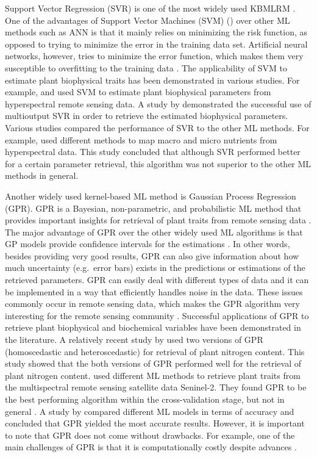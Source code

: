 \documentclass[a4paper, twoside]{templates/ociamthesis}
\begin{document}
Support Vector Regression (SVR) \citep{drucker1997support} is one of the most widely used KBMLRM \citep{verrelst2019quantifying}. One of the advantages of Support Vector Machines (SVM) (\citet{boser1992training}) over other ML methods such as ANN is that it mainly relies on minimizing the risk function, as opposed to trying to minimize the error in the training data set. Artificial neural networks, however, tries to minimize the error function, which makes them very susceptible to overfitting to the training data \citep{karimi2008application}. The applicability of SVM to estimate plant biophysical traits has been demonstrated in various studies. For example, \citet{karimi2008application} and \citet{yang2011estimating} used SVM to estimate plant biophysical parameters from hyperspectral remote sensing data. A study by \citet{tuia2011multioutput} demonstrated the successful use of multioutput SVR in order to retrieve the estimated biophysical parameters. Various studies compared the performance of SVR to the other ML methods. For example, \citet{pullanagari2016mapping} used different methods to map macro and micro nutrients from hyperspectral data. This study concluded that although SVR performed better for a certain parameter retrieval, this algorithm was not superior to the other ML methods in general.

Another widely used kernel-based ML method is Gaussian Process Regression (GPR). GPR is a Bayesian, non-parametric, and probabilistic ML method that provides important insights for retrieval of plant traits from remote sensing data \citep{camps2016survey, camps2019perspective}. The major advantage of GPR over the other widely used ML algorithms is that GP models provide confidence intervals for the estimations \citep{berger2020retrieval}. In other words, besides providing very good results, GPR can also give information about how much uncertainty (e.g.~error bars) exists in the predictions or estimations of the retrieved parameters. GPR can easily deal with different types of data and it can be implemented in a way that efficiently handles noise in the data. These issues commonly occur in remote sensing data, which makes the GPR algorithm very interesting for the remote sensing community \citep{camps2016survey, camps2019perspective}. Successful applications of GPR to retrieve plant biophysical and biochemical variables have been demonstrated in the literature. A relatively recent study by \citet{berger2020retrieval} used two versions of GPR (homoscedastic and heteroscedastic) for retrieval of plant nitrogen content. This study showed that the both versions of GPR performed well for the retrieval of plant nitrogen content. \citet{upreti2019comparison} used different ML methods to retrieve plant traits from the multispectral remote sensing satellite data Seninel-2. They found GPR to be the best performing algorithm within the cross-validation stage, but not in general \citep{upreti2019comparison}. A study by \citet{caicedo2014toward} compared different ML models in terms of accuracy and concluded that GPR yielded the most accurate results. However, it is important to note that GPR does not come without drawbacks. For example, one of the main challenges of GPR is that it is computationally costly despite advances \citep{camps2019perspective}.
\end{document}
